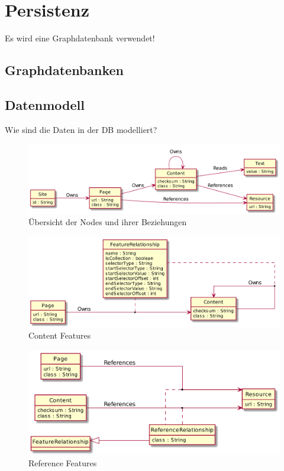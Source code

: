 \section{Persistenz}
    Es wird eine Graphdatenbank verwendet!

    \subsection{Graphdatenbanken}

    \subsection{Datenmodell}
        Wie sind die Daten in der DB modelliert?

        \begin{figure}
            \centering
            \includegraphics[width=\textwidth]{../resources/db-data-model/nodes.png}
            \caption{Übersicht der Nodes und ihrer Beziehungen}
            \label{image:dbDataModelOverview}
        \end{figure}

        \begin{figure}
            \centering
            \includegraphics[width=\textwidth]{../resources/db-data-model/content-relationship.png}
            \caption{Content Features}
            \label{image:dbDataModelContentRelationship}
        \end{figure}

        \begin{figure}
            \centering
            \includegraphics[width=\textwidth]{../resources/db-data-model/resource-relationship.png}
            \caption{Reference Features}
            \label{image:dbDataModelResourceRelationship}
        \end{figure}

